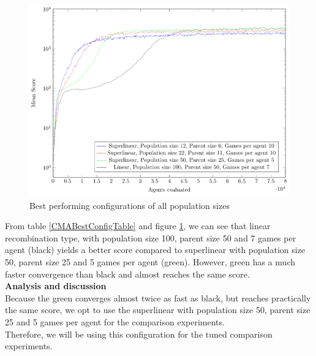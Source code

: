 \begin{figure}[H]
\centering
\includegraphics[scale=0.8]{data/cma_population_offspring/bestofall_population/PlotFile.pdf}
\caption{Best performing configurations of all population sizes \label{CMABestConfigPlot}}
\end{figure}

From table \ref{CMABestConfigTable} and figure \ref{CMABestConfigPlot}, we can see that
linear recombination type, with population size 100, parent size 50 and 7 games per agent
(black) yields a better score compared to superlinear with population size 50, parent size 25 and 5 games per agent (green).
However, green has a much faster convergence than black and almost reaches the same score.\\

\textbf{Analysis and discussion}\\
Because the green converges almost twice as fast as black, but reaches practically the same
score, we opt to use the superlinear with population size 50, parent size 25 and 5 games per agent for the comparison experiments.\\
Therefore, we will be using this configuration for the tuned comparison experiments.








